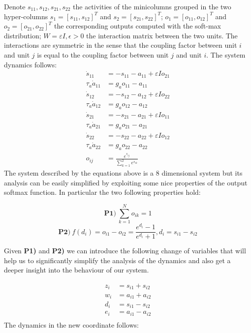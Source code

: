 Denote $s_{11}, s_{12}, s_{21}, s_{22}$ the activities of the minicolumns grouped in the two hyper-columns $s_1 = [s_{11}, s_{12}]^T$ and $s_2 = [s_{21}, s_{22}]^T$;  $o_1 = [o_{11}, o_{12}]^T$ and $o_2 = [o_{21}, o_{22}]^T$ the corresponding outputs computed with the soft-max distribution; $W=\varepsilon I, \epsilon>0$ the interaction matrix between the two units. The interactions are symmetric in the sense that the coupling factor between unit $i$ and unit $j$ is equal to the coupling factor between unit $j$ and unit $i$.  The system dynamics follows:
\begin{equation}
\begin{aligned}
    \dot{s}_{11}&=-s_{11}-a_{11}+\varepsilon I o_{21} \\
    \tau_a \dot{a}_{11}&=g_a o_{11} - a_{11} \\
    \dot{s}_{12}&=-s_{12}-a_{12}+\varepsilon I o_{22} \\
    \tau_a \dot{a}_{12}&=g_a o_{12} - a_{12} \\
    \dot{s}_{21}&=-s_{21}-a_{21}+\varepsilon I o_{11} \\
    \tau_a \dot{a}_{21}&=g_a o_{21} - a_{21} \\
    \dot{s}_{22}&=-s_{22}-a_{22}+\varepsilon I o_{12} \\
    \tau_a \dot{a}_{22}&=g_a o_{22} - a_{22} \\
    o_{i j}&=\frac{e^{s_{i j}}}{\sum_{k=1}^{2} e^{s_{i k}}}
\end{aligned}
\label{eq:jac_s1121}
\end{equation}
The system described by the equations above is a 8 dimensional system but its analysis can be easily simplified by exploiting some nice properties of the output softmax function. In particular the two following properties hold:

\begin{equation}
\mathbf{P1)}\ \sum_{k=1}^{N} o_{i k}=1
\end{equation}
\begin{equation}
\mathbf{P2)}\ f(d_i)= o_{i1}-o_{i2}=\frac{e^{d_i}-1}{e^{d_i}+1}, d_i = s_{i1}-s_{i2}
\end{equation}

Given \textbf{P1)} and \textbf{P2)} we can introduce the following change of variables that will help us to significantly simplify the analysis of the dynamics and also get a deeper insight into the behaviour of our system. 

\begin{equation}
\begin{aligned}
z_i &= s_{i1} + s_{i2} \\
w_i &= a_{i1} + a_{i2} \\
d_i &= s_{i1} - s_{i2} \\
e_i &= a_{i1} - a_{i2} \\
\end{aligned}
\end{equation}
The dynamics in the new coordinate follows:

